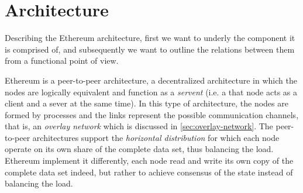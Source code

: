 \section{Architecture}

Describing the Ethereum architecture, first we want to underly the component it
is comprised of, and subsequently we want to outline the relations between them
from a functional point of view.

Ethereum is a peer-to-peer architecture, a decentralized architecture in which
the nodes are logically equivalent and function as a \emph{servent} (i.e. a that
node acts as a client and a sever at the same time). In this type of
architecture, the nodes are formed by processes and the links represent the
possible communication channels, that is, an \emph{overlay network}
\cite{van2017distributed} which is discussed in \autoref{sec:overlay-network}.
The peer-to-peer architectures support the \emph{horizontal distribution} for
which each node operate on its own share of the complete data set, thus
balancing the load. Ethereum implement it differently, each node read and write
its own copy of the complete data set indeed, but rather to achieve consensus of
the state instead of balancing the load.


